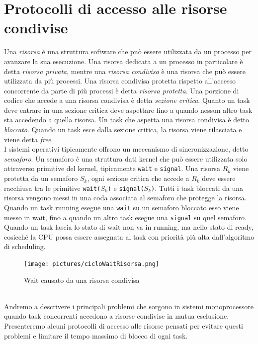 \documentclass[12pt,openany,onesided]{book}
\begin{document}
\chapter{Protocolli di accesso alle risorse condivise}
Una \textit{risorsa} è una struttura software che può essere utilizzata da un processo per avanzare la sua esecuzione.
Una risorsa dedicata a un processo in particolare è detta \textit{risorsa privata}, mentre una \textit{risorsa condivisa} è una risorsa che può essere utilizzata da più processi.
Una risorsa condivisa protetta rispetto all'accesso concorrente da parte di più processi è detta \textit{risorsa protetta}.
Una porzione di codice che accede a una risorsa condivisa è detta \textit{sezione critica}.
Quanto un task deve entrare in una sezione critica deve aspettare fino a quando nessun altro task sta accedendo a quella risorsa.
Un task che aspetta una risorsa condivisa è detto \textit{bloccato}.
Quando un task esce dalla sezione critica, la risorsa viene rilasciata e viene detta \textit{free}.
\\
I sistemi operativi tipicamente offrono un meccanismo di sincronizzazione, detto \textit{semaforo}.
Un semaforo è una struttura dati kernel che può essere utilizzata solo attraverso primitive del kernel, tipicamente \texttt{wait} e \texttt{signal}.
Una risorsa $R_k$ viene protetta da un semaforo $S_k$, ogni sezione critica che accede a $R_k$ deve essere racchiusa tra le primitive \texttt{wait($S_k$)} e \texttt{signal($S_k$)}.
Tutti i task bloccati da una risorsa vengono messi in una coda associata al semaforo che protegge la risorsa.
Quando un task running esegue una \texttt{wait} su un semaforo bloccato esso viene messo in wait, fino a quando un altro task esegue una \texttt{signal} su quel semaforo.
Quando un task lascia lo stato di wait non va in running, ma nello stato di ready, cosicché la CPU possa essere assegnata al task con priorità più alta dall'algoritmo di scheduling.
\begin{figure}[h]
    \centering
    \texttt{[image: pictures/cicloWaitRisorsa.png]}
    \caption{Wait causato da una risorsa condivisa}
\end{figure}
\\
Andremo a descrivere i principali problemi che sorgono in sistemi monoprocessore quando task concorrenti accedono a risorse condivise in mutua esclusione.
Presenteremo alcuni protocolli di accesso alle risorse pensati per evitare questi problemi e limitare il tempo massimo di blocco di ogni task.
\end{document}
